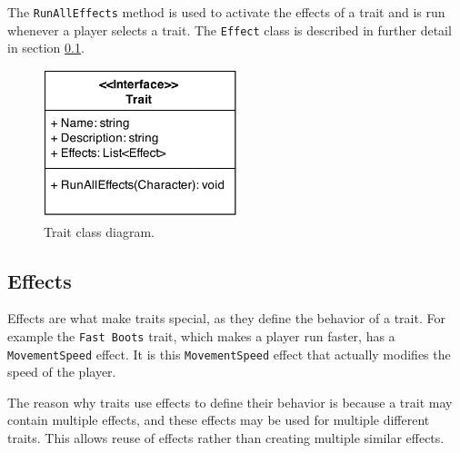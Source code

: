The \texttt{RunAllEffects} method is used to activate the effects of a trait and is run whenever a player selects a trait.
The \texttt{Effect} class is described in further detail in section \ref{sec:modules:effects}.

\begin{figure}[H]
\centering
\includegraphics[width=0.5\textwidth]{figures/traits/TraitClassDiagram.png}
\caption{Trait class diagram.}
\label{traits:traitclassdiagram}
\end{figure}

\subsection{Effects}
\label{sec:modules:effects}

Effects are what make traits special, as they define the behavior of a trait.
For example the \texttt{Fast Boots} trait, which makes a player run faster, has a \texttt{MovementSpeed} effect.
It is this \texttt{MovementSpeed} effect that actually modifies the speed of the player.

The reason why traits use effects to define their behavior is because a trait may contain multiple effects, and these effects may be used for multiple different traits.
This allows reuse of effects rather than creating multiple similar effects.

